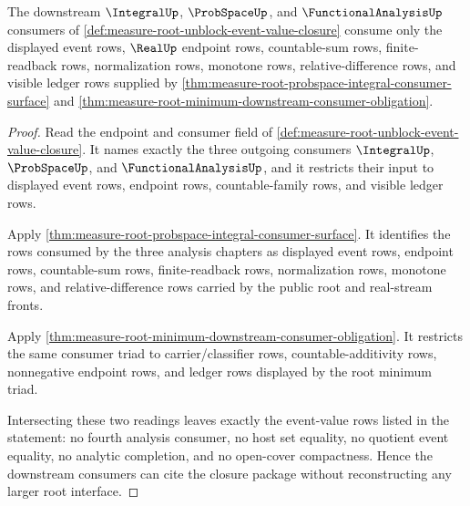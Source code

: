 \begin{theorem}
\label{thm:measure-root-unblock-analysis-consumer-event-value-closure}
The downstream $\IntegralUp$, $\ProbSpaceUp$, and
$\FunctionalAnalysisUp$ consumers of
\autoref{def:measure-root-unblock-event-value-closure} consume only the
displayed event rows, $\RealUp$ endpoint rows, countable-sum rows,
finite-readback rows, normalization rows, monotone rows,
relative-difference rows, and visible ledger rows supplied by
\autoref{thm:measure-root-probspace-integral-consumer-surface} and
\autoref{thm:measure-root-minimum-downstream-consumer-obligation}.
\end{theorem}
\begin{proof}
Read the endpoint and consumer field of
\autoref{def:measure-root-unblock-event-value-closure}. It names exactly the
three outgoing consumers $\IntegralUp$, $\ProbSpaceUp$, and
$\FunctionalAnalysisUp$, and it restricts their input to displayed event
rows, endpoint rows, countable-family rows, and visible ledger rows.

Apply \autoref{thm:measure-root-probspace-integral-consumer-surface}. It
identifies the rows consumed by the three analysis chapters as displayed
event rows, endpoint rows, countable-sum rows, finite-readback rows,
normalization rows, monotone rows, and relative-difference rows carried by
the public root and real-stream fronts.

Apply \autoref{thm:measure-root-minimum-downstream-consumer-obligation}. It
restricts the same consumer triad to carrier/classifier rows,
countable-additivity rows, nonnegative endpoint rows, and ledger rows
displayed by the root minimum triad.

Intersecting these two readings leaves exactly the event-value rows listed
in the statement: no fourth analysis consumer, no host set equality, no
quotient event equality, no analytic completion, and no open-cover
compactness. Hence the downstream consumers can cite the closure package
without reconstructing any larger root interface.
\end{proof}
